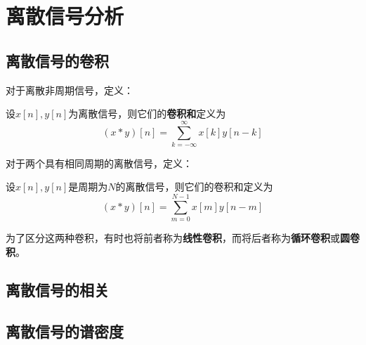 \section{离散信号分析}\label{sec:Discrete_Convolution}

\subsection{离散信号的卷积}\label{sub:discrete_conv}

对于离散非周期信号，定义：
\begin{definition}[卷积和]
    设$x[n],y[n]$为离散信号，则它们的\textbf{卷积和}定义为
    \[(x*y)[n]=\sum_{k=-\infty}^{\infty}x[k]y[n-k]\]
\end{definition}

对于两个具有相同周期的离散信号，定义：
\begin{definition}[周期离散信号的卷积和]
    设$x[n],y[n]$是周期为$N$的离散信号，则它们的卷积和定义为
    \[(x*y)[n]=\sum_{m=0}^{N-1}x[m]y[n-m]\]
\end{definition}

为了区分这两种卷积，有时也将前者称为\textbf{线性卷积}，而将后者称为\textbf{循环卷积}或\textbf{圆卷积}。

\subsection{离散信号的相关}\label{sub:discrete_corr}

\subsection{离散信号的谱密度}\label{sub:discrete_density}